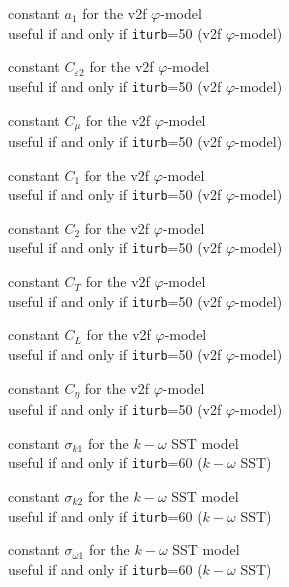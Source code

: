 
{constant $a_1$ for the v2f $\varphi$-model\\
useful if and only if {\tt iturb}=50
(v2f $\varphi$-model)}

{constant $C_{\varepsilon 2}$ for the v2f $\varphi$-model\\
useful if and only if {\tt iturb}=50
(v2f $\varphi$-model)}

{constant $C_\mu$ for the v2f $\varphi$-model\\
useful if and only if {\tt iturb}=50
(v2f $\varphi$-model)}

{constant $C_1$ for the v2f $\varphi$-model\\
useful if and only if {\tt iturb}=50
(v2f $\varphi$-model)}

{constant $C_2$ for the v2f $\varphi$-model\\
useful if and only if {\tt iturb}=50
(v2f $\varphi$-model)}

{constant $C_T$ for the v2f $\varphi$-model\\
useful if and only if {\tt iturb}=50
(v2f $\varphi$-model)}

{constant $C_L$ for the v2f $\varphi$-model\\
useful if and only if {\tt iturb}=50
(v2f $\varphi$-model)}

{constant $C_\eta$ for the v2f $\varphi$-model\\
useful if and only if {\tt iturb}=50
(v2f $\varphi$-model)}


{constant $\sigma_{k1}$ for the $k-\omega$ SST model\\
useful if and only if {\tt iturb}=60
($k-\omega$ SST)}

{constant $\sigma_{k2}$ for the $k-\omega$ SST model\\
useful if and only if {\tt iturb}=60
($k-\omega$ SST)}

{constant $\sigma_{\omega 1}$ for the $k-\omega$ SST model\\
useful if and only if {\tt iturb}=60
($k-\omega$ SST)}

